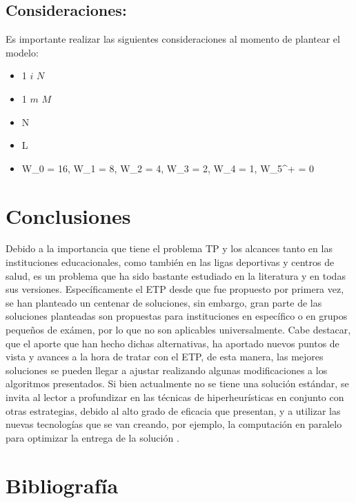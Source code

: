 \documentclass[letter, 10pt]{article}
\begin{document}
\subsection{Consideraciones:}
Es importante realizar las siguientes consideraciones al momento de plantear el modelo:
\begin{center}
    \begin{itemize}
        \item 1 \leq $i$ \leq $N$ 
    \end{itemize}
\end{center}
\begin{center}
    \begin{itemize}
        \item 1 \leq $m$ \leq $M$
    \end{itemize}
\end{center}
\begin{center}
    \begin{itemize}
        \item N 
    \end{itemize}
\end{center}
\begin{center}
    \begin{itemize}
       \item L 
    \end{itemize}
\end{center}
\begin{center}
    \begin{itemize}
       \item W_{0} = 16, W_{1} = 8, W_{2} = 4, W_{3} = 2, W_{4} = 1, W_{5^+} = 0 
    \end{itemize}
\end{center}


\section{Conclusiones}
\label{Conclusiones}
Debido a la importancia que tiene el problema TP y los alcances tanto en las instituciones educacionales, como también en las ligas deportivas y centros de salud, es un problema que ha sido bastante estudiado en la literatura y en todas sus versiones. Específicamente el ETP desde que fue propuesto por primera vez, se han planteado un centenar de soluciones, sin embargo, gran parte de las soluciones planteadas son propuestas para instituciones en específico o en grupos pequeños de exámen, por lo que no son aplicables universalmente. Cabe destacar, que el aporte que han hecho dichas alternativas, ha aportado nuevos puntos de vista y avances a la hora de tratar con el ETP, de esta manera, las mejores soluciones se pueden llegar a ajustar realizando algunas modificaciones a los algoritmos presentados. Si bien actualmente no se tiene una solución estándar, se invita al lector a profundizar en las técnicas de hiperheurísticas en conjunto con otras estrategias, debido al alto grado de eficacia que presentan, y a utilizar las nuevas tecnologías que se van creando, por ejemplo, la computación en paralelo para optimizar la entrega de la solución \cite{Cita25}.


\section{Bibliograf\'ia}
\label{Bibliografía}



\end{document}
